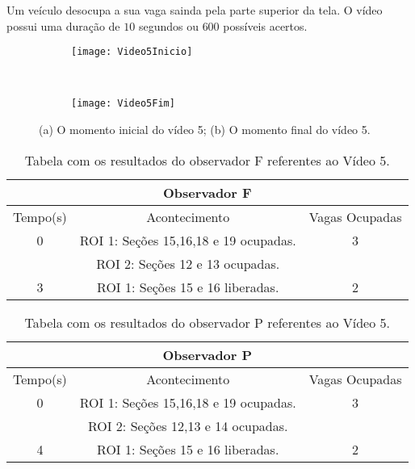 Um veículo desocupa a sua vaga sainda pela parte superior da tela. O vídeo possui uma duração de $10$ segundos ou $600$ possíveis acertos.

\begin{figure}[H]
\centering
\begin{subfigure}{.5\textwidth}
\centering
\texttt{[image: Video5Inicio]}
\caption{}
\end{subfigure}\
\begin{subfigure}{.5\textwidth}
\centering
\texttt{[image: Video5Fim]}
\caption{}
\end{subfigure}
\centering
\caption{(a) O momento inicial do vídeo 5; (b) O momento final do vídeo 5.}%
\label{}%
\end{figure}

\begin{table}[H]
\begin{center}
\begin{tabular}{|c||c||c|}
\hline
\multicolumn{3}{|c|}{Observador F}  \\ \hline \hline
Tempo(s) & Acontecimento & Vagas Ocupadas\\ \hline
0 & ROI 1: Seções 15,16,18 e 19 ocupadas. & 3 \\
 & ROI 2: Seções 12 e 13 ocupadas. &  \\ \hline
3 & ROI 1: Seções 15 e 16 liberadas. & 2 \\
\hline
\end{tabular}
\end{center}
\caption{Tabela com os resultados do observador F referentes ao Vídeo 5.}
\label{tab:video5F}
\end{table}

\begin{table}[H]
\begin{center}
\begin{tabular}{|c||c||c|}
\hline
\multicolumn{3}{|c|}{Observador P}  \\ \hline \hline
Tempo(s) & Acontecimento & Vagas Ocupadas\\ \hline
0 & ROI 1: Seções 15,16,18 e 19 ocupadas. & 3 \\
 & ROI 2: Seções 12,13 e 14 ocupadas. &  \\ \hline
4 & ROI 1: Seções 15 e 16 liberadas. & 2 \\
\hline
\end{tabular}
\end{center}
\caption{Tabela com os resultados do observador P referentes ao Vídeo 5.}
\label{tab:video5P}
\end{table}

